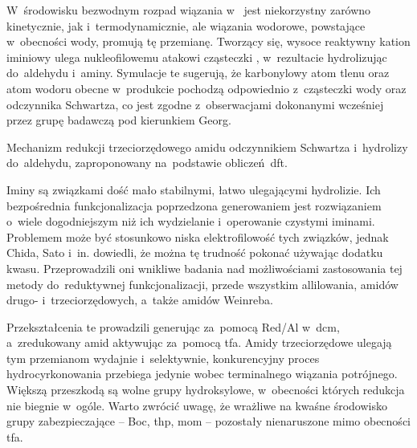 W~środowisku bezwodnym rozpad wiązania  w~ jest niekorzystny zarówno
  kinetycznie, jak i~termodynamicznie, ale wiązania wodorowe, powstające w~obecności wody,
  promują tę przemianę.
Tworzący się, wysoce reaktywny kation iminiowy  ulega nukleofilowemu atakowi
  cząsteczki , w~rezultacie hydrolizując do~aldehydu i~aminy.
Symulacje te sugerują, że karbonylowy atom tlenu oraz atom wodoru obecne w~produkcie pochodzą
  odpowiednio z~cząsteczki wody oraz odczynnika Schwartza, co jest zgodne z~obserwacjami dokonanymi
  wcześniej przez grupę badawczą pod kierunkiem Georg.
\begin{scheme*}
  
  \caption{
    Mechanizm redukcji trzeciorzędowego amidu odczynnikiem Schwartza i~hydrolizy do~aldehydu,
    zaproponowany na~podstawie obliczeń~\gls{dft}.
  }
  \label{sch:schwartz-calc}
\end{scheme*}

Iminy są związkami dość mało stabilnymi, łatwo ulegającymi hydrolizie.
Ich bezpośrednia funkcjonalizacja poprzedzona generowaniem \insitu{} jest rozwiązaniem
  o~wiele dogodniejszym niż ich wydzielanie i~operowanie czystymi iminami.
Problemem może być stosunkowo niska elektrofilowość tych związków, jednak Chida, Sato i~in.
  dowiedli, że można tę trudność pokonać używając dodatku kwasu.
Przeprowadzili oni wnikliwe badania nad możliwościami zastosowania tej metody do~reduktywnej
  funkcjonalizacji, przede wszystkim allilowania, amidów drugo- i~trzeciorzędowych,
  a~także amidów Weinreba.

Przekształcenia te prowadzili generując \schwartz{} \insitu{} za~pomocą Red\-/Al w~\gls{dcm},
  a~zredukowany amid aktywując za~pomocą \gls{tfa}.
Amidy trzeciorzędowe ulegają tym przemianom wydajnie i~selektywnie, konkurencyjny proces
  hydrocyrkonowania przebiega jedynie wobec terminalnego wiązania potrójnego.
Większą przeszkodą są wolne grupy hydroksylowe, w~obecności których redukcja nie biegnie w~ogóle.
Warto zwrócić uwagę, że wrażliwe na kwaśne środowisko grupy zabezpieczające \--- \gls{Boc},
  \gls{thp}, \gls{mom} \--- pozostały nienaruszone mimo obecności \gls{tfa}.

